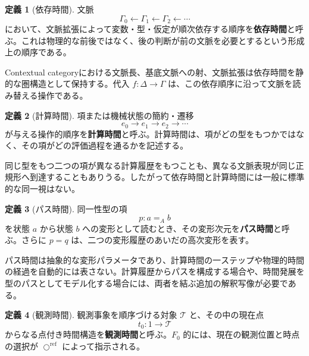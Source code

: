\documentclass[a4paper,11pt]{ltjsarticle}
\theoremstyle{definition}
\newtheorem{definition}{定義}[section]
\theoremstyle{plain}
\newcommand{\CircleRef}{\bigcirc^{\mathrm{ref}}}
\newcommand{\Time}{\mathcal T}
\begin{document}
\begin{definition}[依存時間]
文脈
\begin{equation}
 \Gamma_0
 \longleftarrow
 \Gamma_1
 \longleftarrow
 \Gamma_2
 \longleftarrow\cdots
\end{equation}
において、文脈拡張によって変数・型・仮定が順次依存する順序を\textbf{依存時間}と呼ぶ。これは物理的な前後ではなく、後の判断が前の文脈を必要とするという形成上の順序である。
\end{definition}

Contextual categoryにおける文脈長、基底文脈への射、文脈拡張は依存時間を静的な圏構造として保持する。代入 $f:\Delta\to\Gamma$ は、この依存順序に沿って文脈を読み替える操作である。

\begin{definition}[計算時間]
項または機械状態の簡約・遷移
\begin{equation}
 e_0\longrightarrow e_1\longrightarrow e_2\longrightarrow\cdots
\end{equation}
が与える操作的順序を\textbf{計算時間}と呼ぶ。計算時間は、項がどの型をもつかではなく、その項がどの評価過程を通るかを記述する。
\end{definition}

同じ型をもつ二つの項が異なる計算履歴をもつことも、異なる文脈表現が同じ正規形へ到達することもありうる。したがって依存時間と計算時間には一般に標準的な同一視はない。

\begin{definition}[パス時間]
同一性型の項
\begin{equation}
 p:a=_A b
\end{equation}
を状態 $a$ から状態 $b$ への変形として読むとき、その変形次元を\textbf{パス時間}と呼ぶ。さらに $p=q$ は、二つの変形履歴のあいだの高次変形を表す。
\end{definition}

パス時間は抽象的な変形パラメータであり、計算時間の一ステップや物理的時間の経過を自動的には表さない。計算履歴からパスを構成する場合や、時間発展を型のパスとしてモデル化する場合には、両者を結ぶ追加の解釈写像が必要である。

\begin{definition}[観測時間]
観測事象を順序づける対象 $\Time$ と、その中の現在点
\begin{equation}
 t_0:1\longrightarrow\Time
\end{equation}
からなる点付き時間構造を\textbf{観測時間}と呼ぶ。$F_0$ 的には、現在の観測位置と時点の選択が $\CircleRef$ によって指示される。
\end{definition}
\end{document}
